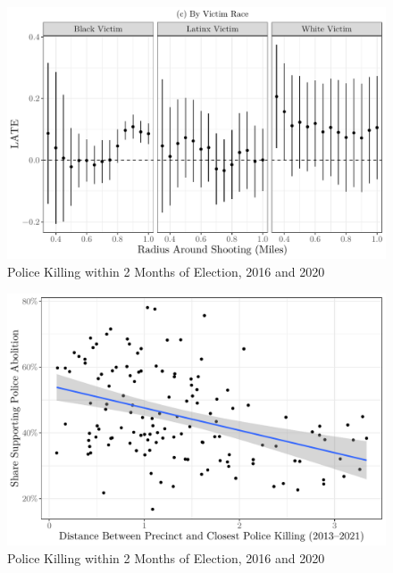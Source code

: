 \documentclass[
  12pt,
]{article}
\begin{document}
\begin{figure}[h]

{\centering \includegraphics{shoot_to_files/figure-latex/victim-1} 

}

\caption{\label{fig:map}Police Killing within 2 Months of Election, 2016 and 2020}\label{fig:victim}
\end{figure}

\begin{figure}[h]

{\centering \includegraphics{shoot_to_files/figure-latex/minn-scatter-1} 

}

\caption{\label{fig:map}Police Killing within 2 Months of Election, 2016 and 2020}\label{fig:minn-scatter}
\end{figure}
\end{document}
